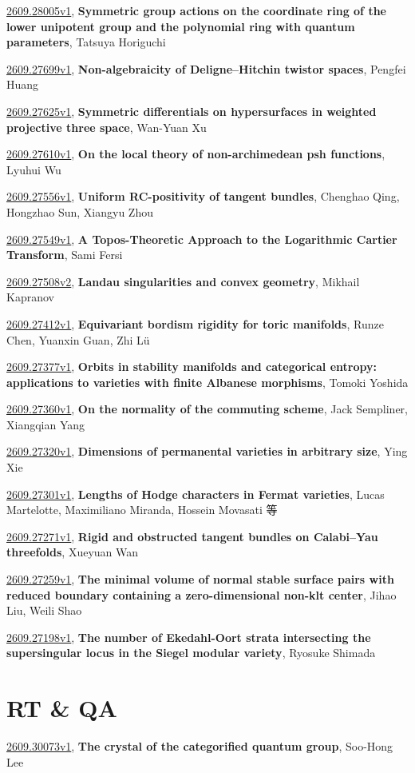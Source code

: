 \documentclass[9pt, a4paper]{article}
\theoremstyle{plain}
\theoremstyle{definition}
\theoremstyle{remark}
\newcommand{\arxiv}[3]{\href{https://arxiv.org/abs/#1}{#1}, \textbf{\textcolor{arxivblue}{#2}}, #3}
\begin{document}
\arxiv{2609.28005v1}{Symmetric group actions on the coordinate ring of the lower unipotent group and the polynomial ring with quantum parameters}{Tatsuya Horiguchi}

\arxiv{2609.27699v1}{Non-algebraicity of Deligne--Hitchin twistor spaces}{Pengfei Huang}

\arxiv{2609.27625v1}{Symmetric differentials on hypersurfaces in weighted projective three space}{Wan-Yuan Xu}

\arxiv{2609.27610v1}{On the local theory of non-archimedean psh functions}{Lyuhui Wu}

\arxiv{2609.27556v1}{Uniform RC-positivity of tangent bundles}{Chenghao Qing, Hongzhao Sun, Xiangyu Zhou}

\arxiv{2609.27549v1}{A Topos-Theoretic Approach to the Logarithmic Cartier Transform}{Sami Fersi}

\arxiv{2609.27508v2}{Landau singularities and convex geometry}{Mikhail Kapranov}

\arxiv{2609.27412v1}{Equivariant bordism rigidity for toric manifolds}{Runze Chen, Yuanxin Guan, Zhi Lü}

\arxiv{2609.27377v1}{Orbits in stability manifolds and categorical entropy: applications to varieties with finite Albanese morphisms}{Tomoki Yoshida}

\arxiv{2609.27360v1}{On the normality of the commuting scheme}{Jack Sempliner, Xiangqian Yang}

\arxiv{2609.27320v1}{Dimensions of permanental varieties in arbitrary size}{Ying Xie}

\arxiv{2609.27301v1}{Lengths of Hodge characters in Fermat varieties}{Lucas Martelotte, Maximiliano Miranda, Hossein Movasati 等}

\arxiv{2609.27271v1}{Rigid and obstructed tangent bundles on Calabi--Yau threefolds}{Xueyuan Wan}

\arxiv{2609.27259v1}{The minimal volume of normal stable surface pairs with reduced boundary containing a zero-dimensional non-klt center}{Jihao Liu, Weili Shao}

\arxiv{2609.27198v1}{The number of Ekedahl-Oort strata intersecting the supersingular locus in the Siegel modular variety}{Ryosuke Shimada}


\section{RT \& QA}
\arxiv{2609.30073v1}{The crystal of the categorified quantum group}{Soo-Hong Lee}
\end{document}
